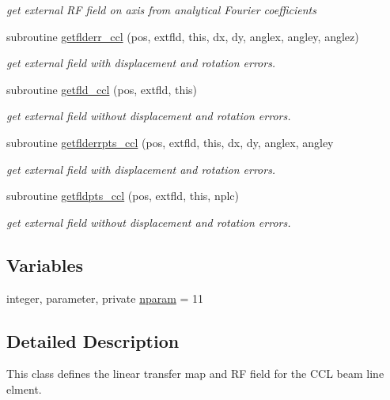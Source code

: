 \begin{DoxyCompactItemize}
\begin{DoxyCompactList}\small\item\em get external RF field on axis from analytical Fourier coefficients \end{DoxyCompactList}\item 
subroutine \mbox{\hyperlink{namespacecclclass_a4d8386891ff89c7352f001b01d5f84b5}{getflderr\+\_\+ccl}} (pos, extfld, this, dx, dy, anglex, angley, anglez)
\begin{DoxyCompactList}\small\item\em get external field with displacement and rotation errors. \end{DoxyCompactList}\item 
subroutine \mbox{\hyperlink{namespacecclclass_a6c8d8825e6d50c30ba91c90892619a5b}{getfld\+\_\+ccl}} (pos, extfld, this)
\begin{DoxyCompactList}\small\item\em get external field without displacement and rotation errors. \end{DoxyCompactList}\item 
subroutine \mbox{\hyperlink{namespacecclclass_a22dde155eb6d5e19ccedbe59cd955580}{getflderrpts\+\_\+ccl}} (pos, extfld, this, dx, dy, anglex, angley
\begin{DoxyCompactList}\small\item\em get external field with displacement and rotation errors. \end{DoxyCompactList}\item 
subroutine \mbox{\hyperlink{namespacecclclass_aa98c971191ca605d023e7c03c447566a}{getfldpts\+\_\+ccl}} (pos, extfld, this, nplc)
\begin{DoxyCompactList}\small\item\em get external field without displacement and rotation errors. \end{DoxyCompactList}\end{DoxyCompactItemize}
\subsection*{Variables}
\begin{DoxyCompactItemize}
\item 
integer, parameter, private \mbox{\hyperlink{namespacecclclass_adeb399ff41e54cda7bdefa51063c0de6}{nparam}} = 11
\end{DoxyCompactItemize}


\subsection{Detailed Description}
This class defines the linear transfer map and RF field for the C\+CL beam line elment. 

